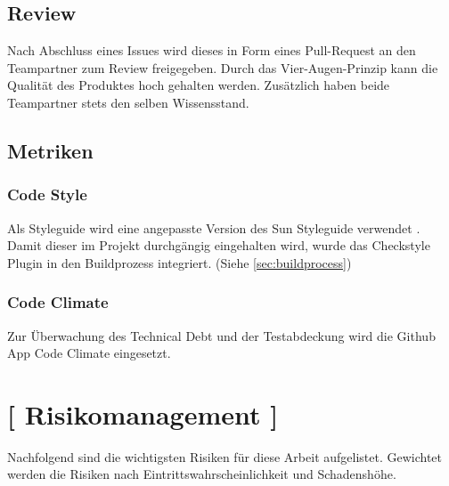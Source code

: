 \documentclass[11pt,a4paper,english,oneside]{book}
\numberwithin{equation}{chapter}
\begin{document}
	\subsection{Review}
	Nach Abschluss eines Issues wird dieses in Form eines Pull-Request an den Teampartner zum Review freigegeben. Durch das Vier-Augen-Prinzip kann die Qualität des Produktes hoch gehalten werden. Zusätzlich haben beide Teampartner stets den selben Wissensstand.
	
	\subsection{Metriken}
	\subsubsection{Code Style}
	Als Styleguide wird eine angepasste Version des Sun Styleguide verwendet \cite{suncheckstyle}. Damit dieser im Projekt durchgängig eingehalten wird, wurde das Checkstyle Plugin \cite{checkstyle} in den Buildprozess integriert. (Siehe \ref{sec:buildprocess})	
	
	\subsubsection{Code Climate}
	Zur Überwachung des Technical Debt und der Testabdeckung wird die Github App Code Climate \cite{codeclimate} eingesetzt.  


	\section{ [ Risikomanagement ] }
	Nachfolgend sind die wichtigsten Risiken für diese Arbeit aufgelistet. Gewichtet werden die Risiken nach Eintrittswahrscheinlichkeit und Schadenshöhe. \cite{risikomanagement}
	
\end{document}
